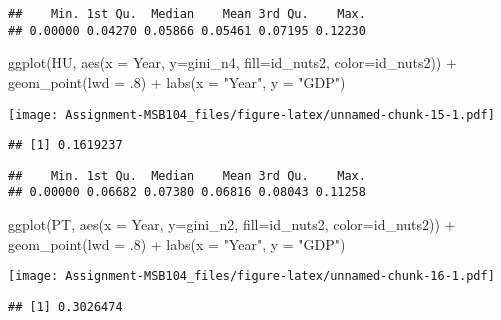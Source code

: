 \documentclass[
]{article}
\newenvironment{Shaded}{\begin{snugshade}}{\end{snugshade}}
\newcommand{\AttributeTok}[1]{\textcolor[rgb]{0.77,0.63,0.00}{#1}}
\newcommand{\DecValTok}[1]{\textcolor[rgb]{0.00,0.00,0.81}{#1}}
\newcommand{\FunctionTok}[1]{\textcolor[rgb]{0.00,0.00,0.00}{#1}}
\newcommand{\NormalTok}[1]{#1}
\newcommand{\SpecialCharTok}[1]{\textcolor[rgb]{0.00,0.00,0.00}{#1}}
\newcommand{\StringTok}[1]{\textcolor[rgb]{0.31,0.60,0.02}{#1}}
\begin{document}
\begin{verbatim}
##    Min. 1st Qu.  Median    Mean 3rd Qu.    Max. 
## 0.00000 0.04270 0.05866 0.05461 0.07195 0.12230
\end{verbatim}

\begin{Shaded}
\begin{Highlighting}[]
  \FunctionTok{ggplot}\NormalTok{(HU, }\FunctionTok{aes}\NormalTok{(}\AttributeTok{x =}\NormalTok{ Year, }\AttributeTok{y=}\NormalTok{gini\_n4, }\AttributeTok{fill=}\NormalTok{id\_nuts2, }\AttributeTok{color=}\NormalTok{id\_nuts2)) }\SpecialCharTok{+}
  \FunctionTok{geom\_point}\NormalTok{(}\AttributeTok{lwd =}\NormalTok{ .}\DecValTok{8}\NormalTok{) }\SpecialCharTok{+}
   \FunctionTok{labs}\NormalTok{(}\AttributeTok{x =} \StringTok{"Year"}\NormalTok{, }\AttributeTok{y =} \StringTok{"GDP"}\NormalTok{)}
\end{Highlighting}
\end{Shaded}

\texttt{[image: Assignment-MSB104\_files/figure-latex/unnamed-chunk-15-1.pdf]}

\begin{verbatim}
## [1] 0.1619237
\end{verbatim}

\begin{verbatim}
##    Min. 1st Qu.  Median    Mean 3rd Qu.    Max. 
## 0.00000 0.06682 0.07380 0.06816 0.08043 0.11258
\end{verbatim}

\begin{Shaded}
\begin{Highlighting}[]
  \FunctionTok{ggplot}\NormalTok{(PT, }\FunctionTok{aes}\NormalTok{(}\AttributeTok{x =}\NormalTok{ Year, }\AttributeTok{y=}\NormalTok{gini\_n2, }\AttributeTok{fill=}\NormalTok{id\_nuts2, }\AttributeTok{color=}\NormalTok{id\_nuts2)) }\SpecialCharTok{+}
  \FunctionTok{geom\_point}\NormalTok{(}\AttributeTok{lwd =}\NormalTok{ .}\DecValTok{8}\NormalTok{) }\SpecialCharTok{+}
   \FunctionTok{labs}\NormalTok{(}\AttributeTok{x =} \StringTok{"Year"}\NormalTok{, }\AttributeTok{y =} \StringTok{"GDP"}\NormalTok{)}
\end{Highlighting}
\end{Shaded}

\texttt{[image: Assignment-MSB104\_files/figure-latex/unnamed-chunk-16-1.pdf]}

\begin{verbatim}
## [1] 0.3026474
\end{verbatim}
\end{document}
